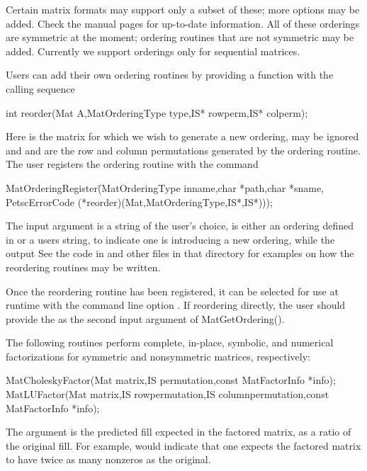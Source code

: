 {{Certain matrix formats may support only a subset of these; more options may
be added. Check the manual pages for up-to-date information. All of these orderings are
symmetric at the moment; ordering routines that are
not symmetric may be added. Currently we support orderings only for
sequential matrices.

Users can add their own ordering routines
by providing a function with the calling sequence
\begin{tabbing}
   int reorder(Mat A,MatOrderingType type,IS* rowperm,IS* colperm);
\end{tabbing}
Here  is the matrix for which we wish to generate a new ordering,
 may be ignored and  and  are the row
and column permutations generated by the ordering routine.
The user registers the ordering routine
with the command
\begin{tabbing}
  MatOrderingRegister\=(MatOrderingType inname,char *path,char *sname,\\
                             \>PetscErrorCode (*reorder)(Mat,MatOrderingType,IS*,IS*)));
\end{tabbing}
The  
input argument  is a string of the user's choice,  is either
an ordering defined in  or a users string,
to indicate one is introducing a new ordering, while the output
See the code in  and other files in that
directory for examples on how the reordering routines may be written.

Once the reordering routine has been registered,
it can be selected for use at runtime with the
command line option  .  If reordering directly,
the user should provide the  as the second input argument of
MatGetOrdering().

The following routines perform complete, in-place, symbolic, and numerical
factorizations for symmetric and nonsymmetric matrices, respectively:
\begin{tabbing}
  MatCholeskyFactor(Mat matrix,IS permutation,const MatFactorInfo *info);\\
  MatLUFactor(Mat matrix,IS rowpermutation,IS columnpermutation,const MatFactorInfo *info);
\end{tabbing}
The argument  is the predicted fill
expected in the factored matrix, as a ratio of the original fill.
For example,  would indicate that one expects the factored
matrix to have twice as many nonzeros as the original.

}}
